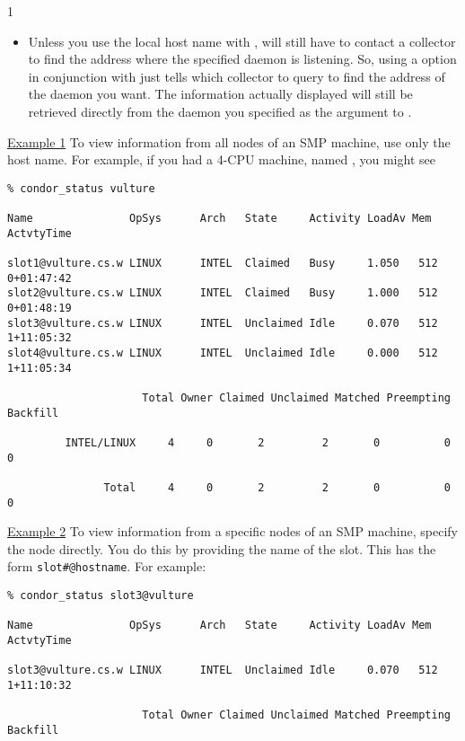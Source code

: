 \begin{ManPage}{\label{man-condor-status}}{1}
\begin{itemize}
	\item Unless you use the local host name with ,
	 will still have to contact a collector to find
	the address where the specified daemon is listening.
	So, using a  option in conjunction with
	 just tells  which collector to
	query to find the address of the daemon you want.
	The information actually displayed will still be retrieved
	directly from the daemon you specified as the argument to
	.

\end{itemize}

\Examples

\underline{Example 1} To view information from all nodes of an SMP
machine, use only the host name.
For example, if you had a 4-CPU machine, named
, you might see
\footnotesize
\begin{verbatim}
% condor_status vulture

Name               OpSys      Arch   State     Activity LoadAv Mem   ActvtyTime

slot1@vulture.cs.w LINUX      INTEL  Claimed   Busy     1.050   512  0+01:47:42
slot2@vulture.cs.w LINUX      INTEL  Claimed   Busy     1.000   512  0+01:48:19
slot3@vulture.cs.w LINUX      INTEL  Unclaimed Idle     0.070   512  1+11:05:32
slot4@vulture.cs.w LINUX      INTEL  Unclaimed Idle     0.000   512  1+11:05:34

                     Total Owner Claimed Unclaimed Matched Preempting Backfill

         INTEL/LINUX     4     0       2         2       0          0        0

               Total     4     0       2         2       0          0        0
\end{verbatim}
\normalsize


\underline{Example 2} To view information from a specific nodes of an
SMP machine, specify the node directly.
You do this by providing the name of the slot.
This has the form \texttt{slot\#@hostname}.
For example:
\footnotesize
\begin{verbatim}
% condor_status slot3@vulture

Name               OpSys      Arch   State     Activity LoadAv Mem   ActvtyTime

slot3@vulture.cs.w LINUX      INTEL  Unclaimed Idle     0.070   512  1+11:10:32

                     Total Owner Claimed Unclaimed Matched Preempting Backfill


\end{verbatim}
\end{ManPage}
